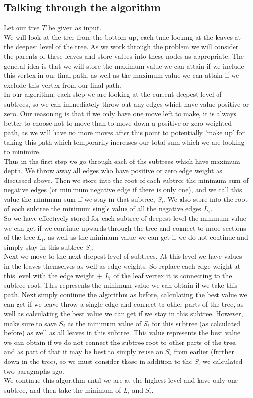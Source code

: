 \documentclass[12pt]{article}
\begin{document}
	\subsection*{Talking through the algorithm}
Let our tree $T$ be given as input. \\
We will look at the tree from the bottom up, each time looking at the leaves at the deepest level of the tree. As we work through the problem we will consider the parents of these leaves and store values into these nodes as appropriate. The general idea is that we will store the maximum value we can attain if we include this vertex in our final path, as well as the maximum value we can attain if we exclude this vertex from our final path.\\
In our algorithm, each step we are looking at the current deepest level of subtrees, so we can immediately throw out any edges which have value positive or zero. Our reasoning is that if we only have one move left to make, it is always better to choose not to move than to move down a positive or zero-weighted path, as we will have no more moves after this point to potentially 'make up' for taking this path which temporarily increases our total sum which we are looking to minimize.\\
Thus in the first step we go through each of the subtrees which have maximum depth. We throw away all edges who have positive or zero edge weight as discussed above. Then we store into the root of each subtree the minimum sum of negative edges (or minimum negative edge if there is only one), and we call this value the minimum sum if we stay in that subtree, $S_i$. We also store into the root of each subtree the minimum single value of all the negative edges $L_i$.\\
So we have effectively stored for each subtree of deepest level the minimum value we can get if we continue upwards through the tree and connect to more sections of the tree $L_i$, as well as the minimum value we can get if we do not continue and simply stay in this subtree $S_i$.\\
Next we move to the next deepest level of subtrees. At this level we have values in the leaves themselves as well as edge weights. So replace each edge weight at this level with the edge weight + $L_i$ of the leaf vertex it is connecting to the subtree root. This represents the minimum value we can obtain if we take this path. Next simply continue the algorithm as before, calculating the best value we can get if we leave throw a single edge and connect to other parts of the tree, as well as calculating the best value we can get if we stay in this subtree. However, make sure to save $S_i$ as the minimum value of $S_i$ for this subtree (as calculated before) as well as all leaves in this subtree. This value represents the best value we can obtain if we do not connect the subtree root to other parts of the tree, and as part of that it may be best to simply reuse an $S_i$ from earlier (further down in the tree), so we must consider those in addition to the $S_i$ we calculated two paragraphs ago.\\
We continue this algorithm until we are at the highest level and have only one subtree, and then take the minimum of $L_i$ and $S_i$.
	
\end{document}
